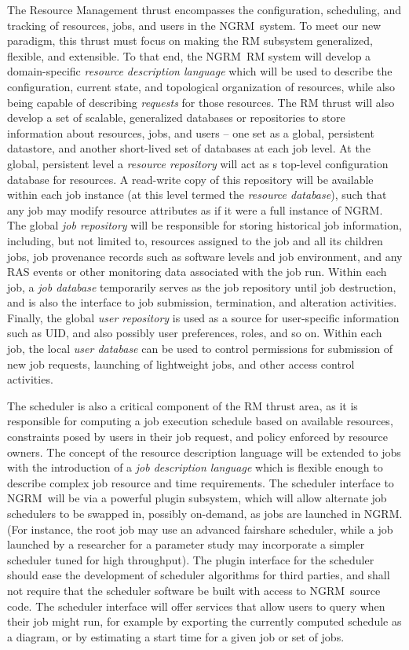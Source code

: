 \documentclass{article}
\newcommand{\ngrm}{NGRM}
\begin{document}
The Resource Management thrust encompasses the configuration,
scheduling, and tracking of resources, jobs, and users in the \ngrm\
system. To meet our new paradigm, this thrust must focus on making
the RM subsystem generalized, flexible, and extensible. To that
end, the \ngrm\ RM system will develop a domain-specific {\em
resource description language} which will be used to describe
the configuration, current state, and topological organization of
resources, while also being capable of describing {\em requests} for
those resources.  The RM thrust will also develop a set of scalable,
generalized databases or repositories to store information about
resources, jobs, and users -- one set as a global, persistent
datastore, and another short-lived set of databases at each job
level. At the global, persistent level a {\em resource repository}
will act as s top-level configuration database for resources. A
read-write copy of this repository will be available within each
job instance (at this level termed the {\em resource database}),
such that any job may modify resource attributes as if it were a
full instance of \ngrm. The global {\em job repository} will be
responsible for storing historical job information, including,
but not limited to, resources assigned to the job and all its
children jobs, job provenance records such as software levels
and job environment, and any RAS events or other monitoring data
associated with the job run. Within each job, a {\em job database}
temporarily serves as the job repository until job destruction,
and is also the interface to job submission, termination, and
alteration activities.  Finally, the global {\em user repository}
is used as a source for user-specific information such as UID, and
also possibly user preferences, roles, and so on. Within each job,
the local {\em user database} can be used to control permissions
for submission of new job requests, launching of lightweight jobs,
and other access control activities.

The scheduler is also a critical component of the RM thrust area,
as it is responsible for computing a job execution schedule based
on available resources, constraints posed by users in their job
request, and policy enforced by resource owners. The concept of
the resource description language will be extended to jobs with the
introduction of a {\em job description language} which is flexible
enough to describe complex job resource and time requirements. The
scheduler interface to \ngrm\ will be via a powerful plugin
subsystem, which will allow alternate job schedulers to be swapped
in, possibly on-demand, as jobs are launched in \ngrm. (For
instance, the root job may use an advanced fairshare scheduler,
while a job launched by a researcher for a parameter study may
incorporate a simpler scheduler tuned for high throughput). The
plugin interface for the scheduler should ease the development of
scheduler algorithms for third parties, and shall not require that
the scheduler software be built with access to \ngrm\ source code.
The scheduler interface will offer services that allow users
to query when their job might run, for example by exporting
the currently computed schedule as a diagram, or by estimating
a start time for a given job or set of jobs.
\end{document}
